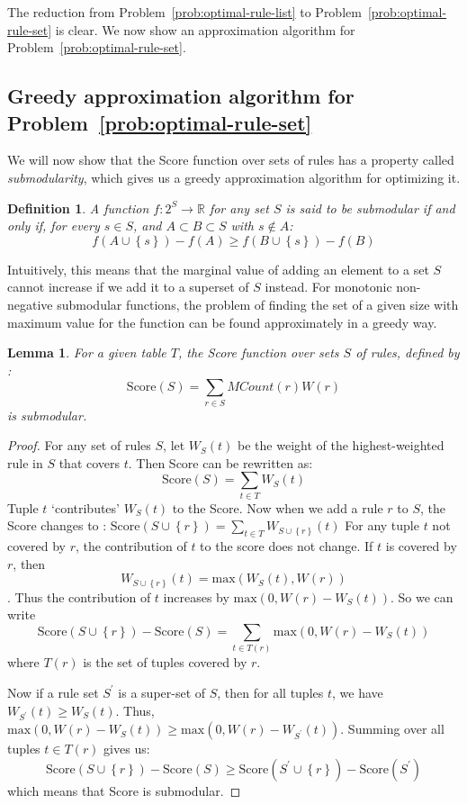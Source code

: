 \documentclass{sig-alternate}
\newtheorem{lemma}{Lemma}
\newtheorem{definition}{Definition}
\newcounter{prob}
\begin{document}
The reduction from Problem~\ref{prob:optimal-rule-list} to Problem~\ref{prob:optimal-rule-set} is clear. We now show an approximation algorithm for Problem~\ref{prob:optimal-rule-set}.

\subsection{Greedy approximation algorithm for Problem~\ref{prob:optimal-rule-set}}
We will now show that the Score function over sets of rules has a property called {\em submodularity}, which gives us a greedy approximation algorithm for optimizing it. 
\begin{definition}
A function $f: 2^S \rightarrow \mathbb{R}$ for any set $S$ is said to be submodular if and only if, for every $s \in S$, and $A \subset B \subset S$ with $s \notin A$:
$$f(A \cup \left\lbrace s \right\rbrace) - f(A) \geq f(B \cup \left\lbrace s \right\rbrace) - f(B)$$
\end{definition}
Intuitively, this means that the marginal value of adding an element to a set $S$ cannot increase if we add it to a superset of $S$ instead. For monotonic non-negative submodular functions, the problem of finding the set of a given size with maximum value for the function can be found approximately in a greedy way. 

\begin{lemma}\label{lemma:submodular}
For a given table $T$, the Score function over sets $S$ of rules, defined by :
$$\text{Score}(S) = \sum_{r \in S} MCount(r)W(r)$$
is submodular.
\end{lemma}
\begin{proof}
For any set of rules $S$, let $W_{S}(t)$ be the weight of the highest-weighted rule in $S$ that covers $t$. Then Score can be rewritten as:
$$\text{Score}(S) = \sum_{t\in T}W_{S}(t)$$
Tuple $t$ `contributes' $W_{S}(t)$ to the Score. Now when we add a rule $r$ to $S$, the Score changes to :
$\text{Score}(S \cup \left\lbrace r \right\rbrace) = \sum_{t\in T}W_{S \cup \left\lbrace r \right\rbrace}(t)$
For any tuple $t$ not covered by $r$, the contribution of $t$ to the score does not change. If $t$ is covered by $r$, then 
$$W_{S\cup \left\lbrace r \right\rbrace}(t) = \textrm{max}(W_{S}(t), W(r))$$. Thus the contribution of $t$ increases by $\textrm{max}(0, W(r) - W_{S}(t))$. So we can write
$$\text{Score}(S \cup \left\lbrace r \right\rbrace) - \text{Score}(S) = \sum_{t \in T(r)} \textrm{max}(0, W(r) - W_{S}(t))$$ where $T(r)$ is the set of tuples covered by $r$.

Now if a rule set $S^{\prime}$ is a super-set of $S$, then for all tuples $t$, we have $W_{S^{\prime}}(t) \geq W_{S}(t)$. Thus,
$\textrm{max}(0, W(r) - W_{S}(t)) \geq \textrm{max}(0, W(r) - W_{S^{\prime}}(t))$. Summing over all tuples $t \in T(r)$ gives us:
$$\text{Score}(S \cup \left\lbrace r \right\rbrace) - \text{Score}(S) \geq \text{Score}(S^{\prime} \cup \left\lbrace r \right\rbrace) - \text{Score}(S^{\prime})$$
which means that Score is submodular.
\end{proof}
\end{document}
